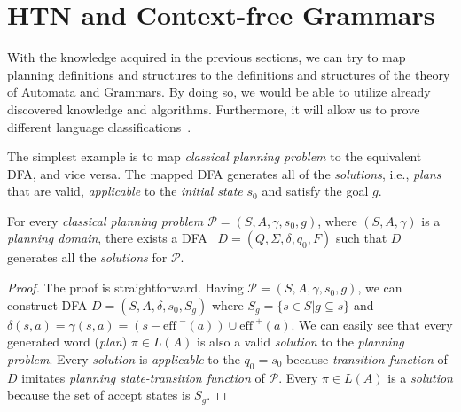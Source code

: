 \begin{example}\label{ex02:5}
\end{example}

\section{HTN and Context-free Grammars}

\medskip\noindent
With the knowledge acquired in the previous sections, we can try to map planning definitions and structures to the definitions and structures of the theory of Automata and Grammars. By doing so, we would be able to utilize already discovered knowledge and algorithms. Furthermore, it will allow us to prove different language classifications~\cite{langclassification}.

\medskip\noindent
The simplest example is to map \emph{classical planning problem} to the equivalent DFA, and vice versa. The mapped DFA generates all of the \emph{solutions}, i.e., \emph{plans} that are valid, \emph{applicable} to the \emph{initial state} $s_0$ and satisfy the goal $g$.

\begin{thm}\label{thm02:1}
    For every \emph{classical planning problem $\mathcal{P} = (S, A, \gamma, s_0, g)$}, where $(S, A, \gamma)$ is a \emph{planning domain}, there exists a DFA~\cite{chytil} $D = (Q, \Sigma, \delta, q_0, F)$ such that $D$ generates all the \emph{solutions} for $\mathcal{P}$.
\end{thm}
\begin{proof}
    The proof is straightforward. Having $\mathcal{P} = (S, A, \gamma, s_0, g)$, we can construct DFA $D = (S,A,\delta,s_0,S_g)$ where $S_g=\{s \in S | g \subseteq s\}$ and $\delta(s,a) = \gamma(s, a) = (s-\text{eff}^{\,\,-}(a)) \cup \text{eff}^{\,\,+}(a)$. We can easily see that every generated word (\emph{plan}) $\pi \in L(A)$ is also a valid \emph{solution} to the \emph{planning problem}. Every \emph{solution} is \emph{applicable} to the $q_0 = s_0$ because \emph{transition function} of $D$ imitates \emph{planning state-transition function} of $\mathcal{P}$. Every $\pi \in L(A)$ is a \emph{solution} because the set of accept states is $S_g$.
\end{proof}

